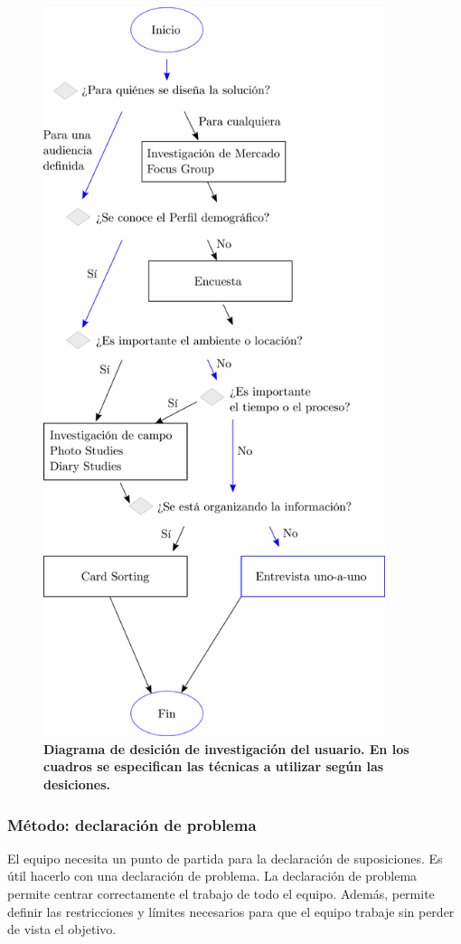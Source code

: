\begin{figure}[H]
\includegraphics[width=10cm]{Img/CPD/3-flow.png}
\centering
\caption{\textbf{ \footnotesize{Diagrama de desición de investigación del usuario. En los cuadros se especifican las técnicas a utilizar según las desiciones.}}}
\label{fig:diagrama-desicion}
\end{figure}

\subsubsection{Método: declaración de problema}
El equipo necesita un punto de partida para la declaración de suposiciones. Es útil hacerlo con una declaración de problema. La declaración de problema permite centrar correctamente el trabajo de todo el equipo. Además, permite definir las restricciones y límites necesarios para que el equipo trabaje sin perder de vista el objetivo.

